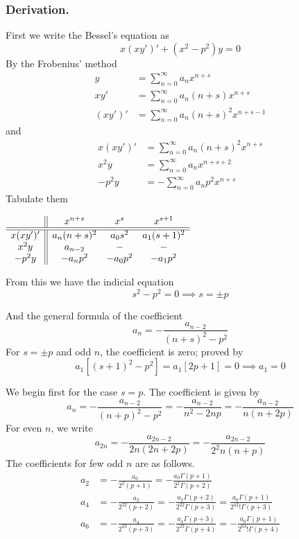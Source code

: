 \documentclass[../main.tex]{subfiles}
\begin{document}
\subsubsection*{Derivation.} First we write the Bessel's equation as 
\begin{equation*}
    x(xy')'+ (x^2-p^2)y=0
\end{equation*}
By the Frobenius' method
\begin{align*}
    y&=\sum_{n=0}^{\infty} a_nx^{n+s}\\
    xy'&=\sum_{n=0}^{\infty} a_n(n+s) x^{n+s}\\
    (xy')'&=\sum_{n=0}^{\infty} a_n(n+s)^2 x^{n+s-1}
\end{align*}
and 
\begin{align*}
    x(xy')'&=\sum_{n=0}^{\infty} a_n(n+s)^2 x^{n+s}\\
    x^2y&=\sum_{n=0}^{\infty} a_n x^{n+s+2}\\
    -p^2y&=-\sum_{n=0}^{\infty} a_np^2x^{n+s}
\end{align*}
Tabulate them
\begin{center}
$\begin{array}{c || c c c}
  &x^{n+s}&x^s&x^{s+1}\\
  \hline\hline
  x(xy')' &a_n(n+s)^2 &a_0s^2 &a_1(s+1)^2\\
  x^2y &a_{n-2}&- &-\\
  -p^2y &-a_np^2&-a_0p^2&-a_1p^2
\end{array}$
\end{center}

From this we have the indicial equation
\begin{equation*}
    s^2-p^2=0\implies s=\pm p
\end{equation*}

And the general formula of the coefficient
\begin{equation*}
    a_n=-\frac{a_{n-2}}{(n+s)^2-p^2}
\end{equation*}
For $s=\pm p$ and odd $n$, the coefficient is zero; proved by 
\begin{equation*}
    a_1\left[(s+1)^2-p^2\right]=a_1\left[2p+1\right]=0\implies a_1=0 
\end{equation*} 

We begin first for the case $s=p$. The coefficient is given by 
\begin{equation*}
    a_n=-\frac{a_{n-2}}{(n+p)^2-p^2}=-\frac{a_{n-2}}{n^2-2np}=-\frac{a_{n-2}}{n(n+2p)}
\end{equation*}
For even $n$, we write
\begin{equation*}
    a_{2n}=-\frac{a_{2n-2}}{2n(2n+2p)}= -\frac{a_{2n-2}}{2^2n(n+p)}
\end{equation*}
The coefficients for few odd $n$ are as follows.
\begin{align*}
    a_2&=-\frac{a_0}{2^2(p+1)}=-\frac{a_0\Gamma(p+1)}{2^2\Gamma(p+2)}\\
    a_4&=-\frac{a_2}{2^22(p+2)}=-\frac{a_2\Gamma(p+2)}{2^22\Gamma(p+3)}=\frac{a_0\Gamma(p+1)}{2^42!\Gamma(p+3)}\\
    a_6&=-\frac{a_4}{2^23(p+3)}=-\frac{a_4\Gamma(p+3)}{2^23\Gamma(p+4)}=-\frac{a_0\Gamma(p+1)}{2^63!\Gamma(p+4)}
\end{align*}
\end{document}
